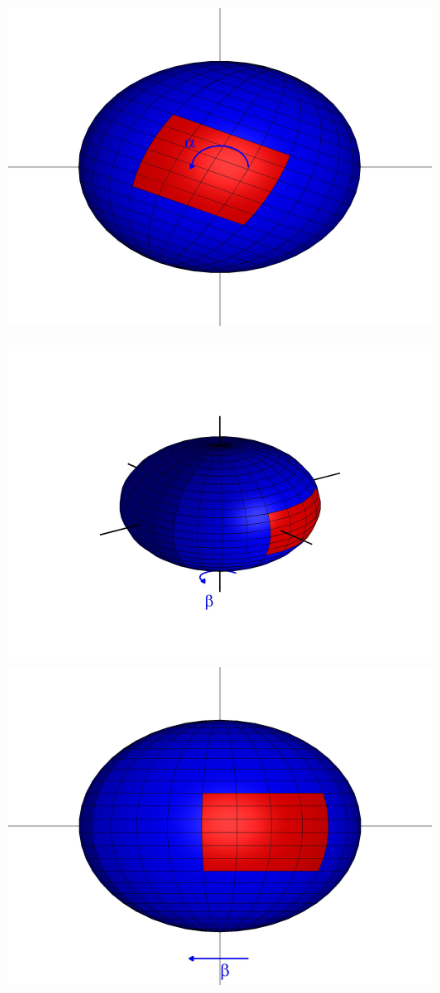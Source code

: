 \documentclass[12pt]{article}
\begin{document}
\begin{figure}[H]
\begin{minipage}{0.2\textwidth}
\includegraphics[width=\textwidth]{sphere2_2}\\
\end{minipage}
\begin{minipage}{0.2\textwidth}
\centering
\includegraphics[width=\textwidth]{sphere_3}\\
\includegraphics[width=\textwidth]{sphere2_3}\\

\end{minipage}
\end{figure}
\end{document}

